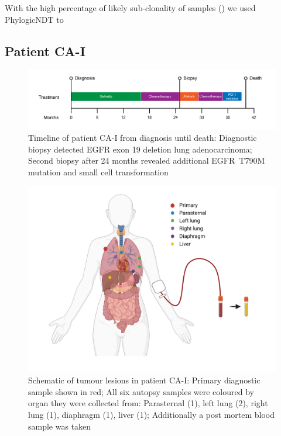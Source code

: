 With the high percentage of likely sub-clonality of samples () we used PhylogicNDT to


\cleardoublepage

\subsection{Patient CA-I}
\label{cascade-sec:CA51}



\begin{figure}[ht]
\centering
\includegraphics[width=.99\linewidth]{Figures/CASCADE/CA51/CA-I_timeline}
\caption[Timeline of patient CA-I from diagnosis until death]{Timeline of patient CA-I from diagnosis until death: Diagnostic biopsy detected EGFR exon 19 deletion lung adenocarcinoma; Second biopsy after 24 months revealed additional EGFR~T790M mutation and small cell transformation} \label{fig:ca51timeline}
\end{figure}



\begin{figure}[ht]
\centering
\includegraphics[width=.99\linewidth]{Figures/CASCADE/CA51/CA-I_schematic_CA51_organColours}
\caption[Schematic of tumour lesions in patient CA-I]{Schematic of tumour lesions in patient CA-I: Primary diagnostic sample shown in red; All six autopsy samples were coloured by organ they were collected from: Parasternal (1), left lung (2), right lung (1), diaphragm (1), liver (1); Additionally a post mortem blood sample was taken} \label{fig:cas51schematic}
\end{figure}

